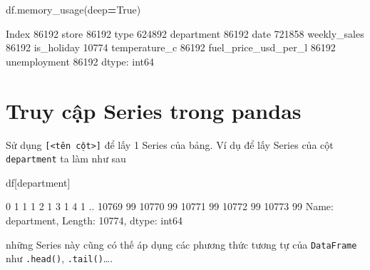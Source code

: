 \documentclass[
]{book}
\newenvironment{Shaded}{\begin{snugshade}}{\end{snugshade}}
\newcommand{\NormalTok}[1]{#1}
\newcommand{\OperatorTok}[1]{\textcolor[rgb]{0.81,0.36,0.00}{\textbf{#1}}}
\newcommand{\StringTok}[1]{\textcolor[rgb]{0.31,0.60,0.02}{#1}}
\newcommand{\VariableTok}[1]{\textcolor[rgb]{0.00,0.00,0.00}{#1}}
\begin{document}
\begin{Shaded}
\begin{Highlighting}[]
\NormalTok{df.memory\_usage(deep}\OperatorTok{=}\VariableTok{True}\NormalTok{) }
\end{Highlighting}
\end{Shaded}

\begin{Shaded}
\begin{Highlighting}[]
\NormalTok{Index                    86192}
\NormalTok{store                    86192}
\NormalTok{type                    624892}
\NormalTok{department               86192}
\NormalTok{date                    721858}
\NormalTok{weekly\_sales             86192}
\NormalTok{is\_holiday               10774}
\NormalTok{temperature\_c            86192}
\NormalTok{fuel\_price\_usd\_per\_l     86192}
\NormalTok{unemployment             86192}
\NormalTok{dtype: int64}
\end{Highlighting}
\end{Shaded}

\section{Truy cập Series trong pandas}\label{truy-cux1eadp-series-trong-pandas}

Sử dụng \texttt{{[}\textless{}tên\ cột\textgreater{}{]}} để lấy 1 Series của bảng. Ví dụ để lấy Series của cột \texttt{department} ta làm như sau

\begin{Shaded}
\begin{Highlighting}[]
\NormalTok{df[}\StringTok{\textquotesingle{}department\textquotesingle{}}\NormalTok{]}
\end{Highlighting}
\end{Shaded}

\begin{Shaded}
\begin{Highlighting}[]
\NormalTok{0         1}
\NormalTok{1         1}
\NormalTok{2         1}
\NormalTok{3         1}
\NormalTok{4         1}
\NormalTok{         ..}
\NormalTok{10769    99}
\NormalTok{10770    99}
\NormalTok{10771    99}
\NormalTok{10772    99}
\NormalTok{10773    99}
\NormalTok{Name: department, Length: 10774, dtype: int64}
\end{Highlighting}
\end{Shaded}

những Series này cũng có thế áp dụng các phương thức tương tự của \texttt{DataFrame} như \texttt{.head()}, \texttt{.tail()}\ldots.
\end{document}
